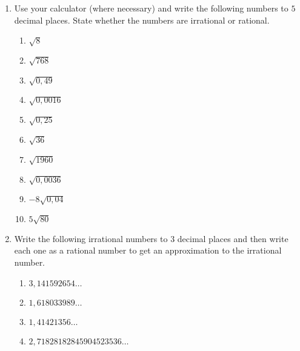 \begin{eocexercises}{}
\begin{enumerate}[itemsep=5pt, label=\textbf{\arabic*}. ]
\item Use your calculator (where necessary) and write the following numbers to $5$ decimal places. State whether the numbers are irrational or rational.
\begin{multicols}{2}
    \begin{enumerate}[itemsep=5pt, label=\textbf{(\alph*)} ] 
    \item $\sqrt{8}$
    \item $\sqrt{768}$
    \item $\sqrt{0,49}$
    \item $\sqrt{0,0016}$
    \item $\sqrt{0,25}$
    \item $\sqrt{36}$
    \item $\sqrt{1960}$
    \item $\sqrt{0,0036}$
    \item $-8\sqrt{0,04}$
    \item $5\sqrt{80}$
    \end{enumerate}
\end{multicols}

\item Write the following irrational numbers to $3$ decimal places and then write each one as a rational number to get an approximation to the irrational number.
\begin{multicols}{2}
\begin{enumerate}[itemsep=5pt, label=\textbf{(\alph*)} ] 
    \item $3,141592654\ldots$
    \item $1,618033989\ldots$
    \item $1,41421356\ldots$
    \item $2,71828182845904523536\ldots$
    \end{enumerate}
\end{multicols}




\end{enumerate}
\end{eocexercises}
